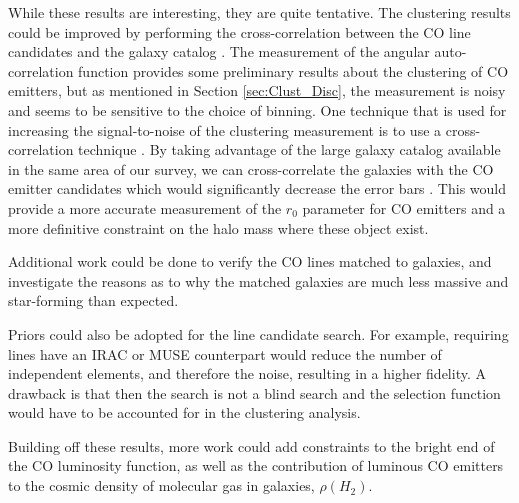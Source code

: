 \documentclass[twoside,single]{lion-msc}
\begin{document}
While these results are interesting, they are quite tentative. The clustering results could be improved by performing the cross-correlation between the CO line candidates and the galaxy catalog \cite{hickox2011clustering, 10.1111/j.1365-2966.2011.20303.x, 10.1111/j.1365-2966.2008.14071.x}. The measurement of the angular auto-correlation function provides some preliminary results about the clustering of CO emitters, but as mentioned in Section \ref{sec:Clust_Disc}, the measurement is noisy and seems to be sensitive to the choice of binning. One technique that is used for increasing the signal-to-noise of the clustering measurement is to use a cross-correlation technique \cite{hickox2011clustering, 10.1111/j.1365-2966.2011.20303.x}. By taking advantage of the large galaxy catalog available in the same area of our survey, we can cross-correlate the galaxies with the CO emitter candidates which would significantly decrease the error bars \cite{hickox2011clustering}. This would provide a more accurate measurement of the $r_0$ parameter for CO emitters and a more definitive constraint on the halo mass where these object exist.

Additional work could be done to verify the CO lines matched to galaxies, and investigate the reasons as to why the matched galaxies are much less massive and star-forming than expected.

Priors could also be adopted for the line candidate search. For example, requiring lines have an IRAC or MUSE counterpart would reduce the number of independent elements, and therefore the noise, resulting in a higher fidelity. A drawback is that then the search is not a blind search and the selection function would have to be accounted for in the clustering analysis.

Building off these results, more work could add constraints to the bright end of the CO luminosity function, as well as the contribution of luminous CO emitters to the cosmic density of molecular gas in galaxies, $\rho(H_2)$.

\appendix




\end{document}
